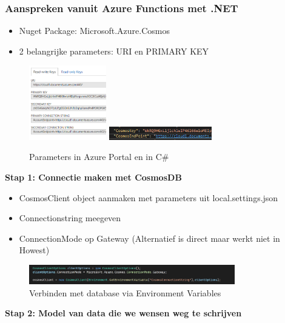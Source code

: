 \documentclass{article}
\newcommand{\bold}[1]{\textbf{#1}}
\begin{document}
\subsubsection{Aanspreken vanuit Azure Functions met .NET}

\begin{itemize}
    \item Nuget Package: Microsoft.Azure.Cosmos
    \item 2 belangrijke parameters: URI en PRIMARY KEY
\end{itemize}

\begin{figure}[H]
    \centering
    \includegraphics[width=0.3\textwidth]{cosmosdb-parameters.png}
    \includegraphics[width=0.4\textwidth]{cosmosdb-localjson.png}
    \caption{Parameters in Azure Portal en in C\#}
\end{figure}

\bold{Stap 1: Connectie maken met CosmosDB}

\begin{itemize}
    \item CosmosClient object aanmaken met parameters uit local.settings.json
    \item Connectionstring meegeven
    \item ConnectionMode op Gateway (Alternatief is direct maar werkt niet in Howest)
\end{itemize}

\begin{figure}[H]
    \centering
    \includegraphics[width=0.8\textwidth]{cosmosdb-stap1.png}
    \caption{Verbinden met database via Environment Variables}
\end{figure}


\bold{Stap 2: Model van data die we wensen weg te schrijven}
\end{document}
